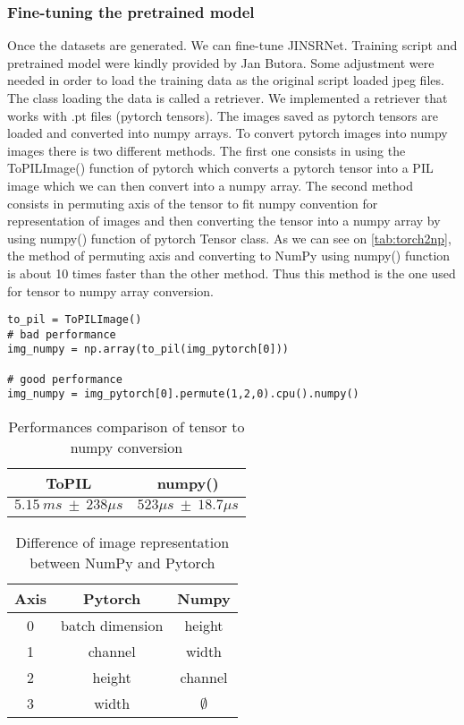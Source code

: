 \documentclass[12pt]{article}
\begin{document}
\subsubsection{Fine-tuning the pretrained model}
Once the datasets are generated. We can fine-tune JINSRNet.
Training script and pretrained model were kindly provided by Jan Butora. Some adjustment were needed in order to load the training data as the original script loaded jpeg files. The class loading the data is called a retriever. We implemented a retriever that works with .pt files (pytorch tensors). The images saved as pytorch tensors are loaded and converted into numpy arrays. To convert pytorch images into numpy images there is two different methods. The first one consists in using the ToPILImage() function of pytorch which converts a pytorch tensor into a PIL image which we can then convert into a numpy array. The second method consists in permuting axis of the tensor to fit numpy convention for representation of images and then converting the tensor into a numpy array by using numpy() function of pytorch Tensor class. As we can see on \autoref{tab:torch2np}, the method of permuting axis and converting to NumPy using numpy() function is about 10 times faster than the other method. Thus this method is the one used for tensor to numpy array conversion.\\

\begin{lstlisting}[caption={Conversion of pytorch tensors into numpy images}, label={lst:example}]
to_pil = ToPILImage()
# bad performance
img_numpy = np.array(to_pil(img_pytorch[0]))

# good performance
img_numpy = img_pytorch[0].permute(1,2,0).cpu().numpy() 
\end{lstlisting}

\begin{table}[H]
    \centering
    \begin{tabular}{|c|c|}
        \hline
        ToPIL & numpy()\\
        \hline
        $5.15\ ms\ \pm\ 238 \mu s$  & $523 \mu s\ \pm\ 18.7 \mu s  $\\
        \hline
    \end{tabular}
    \caption[short]{Performances comparison of tensor to numpy conversion}
    \label{tab:torch2np}
\end{table}

\begin{table}[H]
    \centering
\begin{tabular}{|c|c|c|}
    \hline
    Axis & Pytorch & Numpy \\
    \hline
    0 & batch dimension & height \\
    \hline
    1 & channel & width\\
    \hline
    2 & height & channel\\
    \hline
    3 & width & $\emptyset$\\
    \hline
\end{tabular}    
\caption[short]{Difference of image representation between NumPy and Pytorch}
\end{table}
\end{document}
